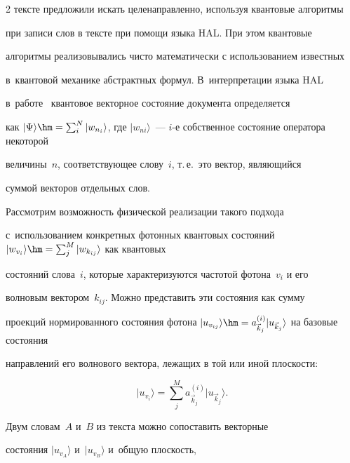 \begin{multicols}{2}
текс\-те предложили искать целенаправленно, используя квантовые алгоритмы 


при записи слов в текс\-те при помощи языка HAL. При этом квантовые 


алгоритмы реализовывались чис\-то математически с использованием известных 


в~квантовой механике абстрактных формул. В~интерпретации языка HAL 


в~работе~\cite{6-an} квантовое векторное со\-сто\-яние документа определяется 


как $\vert \Psi\rangle \hm= \sum\nolimits_i^N \vert w_{n_i}\rangle$, где $\vert 


w_{ni}\rangle$~--- $i$-е собственное со\-сто\-яние оператора некоторой 


величины~$n$, со\-от\-вет\-ст\-ву\-ющее слову~$i$, т.\,е.\ это вектор, яв\-ля\-ющий\-ся 


суммой векторов отдельных слов.


    


    Рассмотрим возможность физической реализации такого подхода 


с~использованием конкретных фотонных квантовых со\-сто\-яний $\vert 


w_{v_i}\rangle\hm=\sum\nolimits_j^M \vert w_{k_{ij}}\rangle$ как квантовых 


со\-сто\-яний слова~$i$, которые характеризуются час\-то\-той фотона~$v_i$ и его 


вол\-но\-вым вектором~$k_{ij}$. Можно представить эти со\-сто\-яния как сумму 


проекций нормированного со\-сто\-яния фотона $\vert u_{v_{ij}}\rangle \hm= 


a^{(i)}_{\vec{k}_j} \vert u_{\vec{k}_j}\rangle$  на базовые со\-сто\-яния 


на\-прав\-ле\-ний его волнового век\-то\-ра, лежащих в той или иной плос\-кости: 


$$


\vert  u_{v_i}\rangle = \sum\limits_j^M a^{(i)}_{\vec{k}_j} \vert 


u_{\vec{k}_j}\rangle.


$$


    


    Двум словам~$A$ и~$B$ из текста можно сопоставить векторные 


состояния $\vert u_{v_A}\rangle$ и~$\vert u_{v_B}\rangle$  и~об\-щую плос\-кость, 



\end{multicols}
